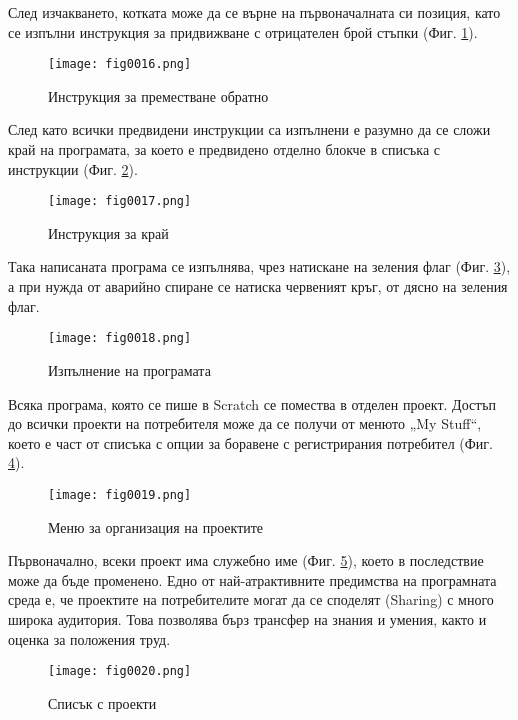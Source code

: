 След изчакването, котката може да се върне на първоначалната си позиция, като се изпълни инструкция за придвижване с отрицателен брой стъпки (Фиг. \ref{fig0016}).

\begin{figure}[H]
  \centering
  \texttt{[image: fig0016.png]}
  \caption{Инструкция за преместване обратно}
\label{fig0016}
\end{figure}

След като всички предвидени инструкции са изпълнени е разумно да се сложи край на програмата, за което е предвидено отделно блокче в списъка с инструкции (Фиг. \ref{fig0017}).

\begin{figure}[H]
  \centering
  \texttt{[image: fig0017.png]}
  \caption{Инструкция за край}
\label{fig0017}
\end{figure}

Така написаната програма се изпълнява, чрез натискане на зеления флаг (Фиг. \ref{fig0018}), а при нужда от аварийно спиране се натиска червеният кръг, от дясно на зеления флаг.

\begin{figure}[H]
  \centering
  \texttt{[image: fig0018.png]}
  \caption{Изпълнение на програмата}
\label{fig0018}
\end{figure}

Всяка програма, която се пише в Scratch се помества в отделен проект. Достъп до всички проекти на потребителя може да се получи от менюто „My Stuff“, което е част от списъка с опции за боравене с регистрирания потребител (Фиг. \ref{fig0019}).

\begin{figure}[H]
  \centering
  \texttt{[image: fig0019.png]}
  \caption{Меню за организация на проектите}
\label{fig0019}
\end{figure}

Първоначално, всеки проект има служебно име (Фиг. \ref{fig0020}), което в последствие може да бъде променено. Едно от най-атрактивните предимства на програмната среда е, че проектите на потребителите могат да се споделят (Sharing) с много широка аудитория. Това позволява бърз трансфер на знания и умения, както и оценка за положения труд. 

\begin{figure}[H]
  \centering
  \texttt{[image: fig0020.png]}
  \caption{Списък с проекти}
\label{fig0020}
\end{figure}

